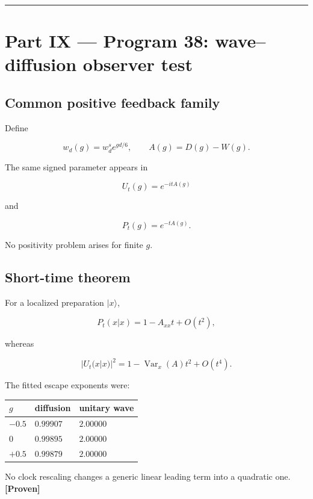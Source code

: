 \documentclass[11pt,a4paper,openany]{report}
\newcommand{\statusProven}{\textcolor{fingreen}{[Proven]}}
\begin{document}
\par\medskip\hrule\medskip

\chapter{Part IX — Program 38: wave–diffusion observer test}

\section{Common positive feedback family}

Define

\[
w_d(g)=w_d^s e^{gd/6},
\qquad
A(g)=D(g)-W(g).
\]

The same signed parameter appears in

\[
U_t(g)=e^{-itA(g)}
\]

and

\[
P_t(g)=e^{-tA(g)}.
\]

No positivity problem arises for finite \(g\).

\section{Short-time theorem}

For a localized preparation \(|x\rangle\),

\[
P_t(x|x)=1-A_{xx}t+O(t^2),
\]

whereas

\[
|U_t(x|x)|^2
=1-\operatorname{Var}_x(A)t^2+O(t^4).
\]

The fitted escape exponents were:

\begin{center}
\begingroup\small
\setlength{\tabcolsep}{3.5pt}
\renewcommand{\arraystretch}{1.16}
\begin{longtable}{@{}p{}p{}p{}@{}}
\toprule
\textbf{\(g\)} & \textbf{diffusion} & \textbf{unitary wave} \\
\midrule
\endhead
\(-0.5\) & \(0.99907\) & \(2.00000\) \\
\(0\) & \(0.99895\) & \(2.00000\) \\
\(+0.5\) & \(0.99879\) & \(2.00000\) \\
\bottomrule
\end{longtable}
\endgroup
\end{center}

No clock rescaling changes a generic linear leading term into a quadratic one. \textbf{\statusProven{}}
\end{document}
